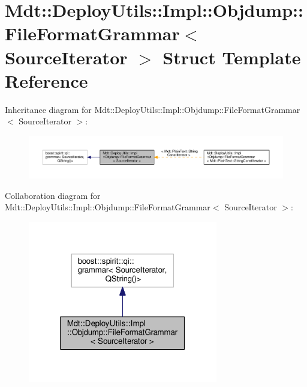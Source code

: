 \hypertarget{struct_mdt_1_1_deploy_utils_1_1_impl_1_1_objdump_1_1_file_format_grammar}{}\section{Mdt\+:\+:Deploy\+Utils\+:\+:Impl\+:\+:Objdump\+:\+:File\+Format\+Grammar$<$ Source\+Iterator $>$ Struct Template Reference}
\label{struct_mdt_1_1_deploy_utils_1_1_impl_1_1_objdump_1_1_file_format_grammar}


Inheritance diagram for Mdt\+:\+:Deploy\+Utils\+:\+:Impl\+:\+:Objdump\+:\+:File\+Format\+Grammar$<$ Source\+Iterator $>$\+:
\nopagebreak
\begin{figure}[H]
\begin{center}
\leavevmode
\includegraphics[width=350pt]{struct_mdt_1_1_deploy_utils_1_1_impl_1_1_objdump_1_1_file_format_grammar__inherit__graph}
\end{center}
\end{figure}


Collaboration diagram for Mdt\+:\+:Deploy\+Utils\+:\+:Impl\+:\+:Objdump\+:\+:File\+Format\+Grammar$<$ Source\+Iterator $>$\+:
\nopagebreak
\begin{figure}[H]
\begin{center}
\leavevmode
\includegraphics[width=235pt]{struct_mdt_1_1_deploy_utils_1_1_impl_1_1_objdump_1_1_file_format_grammar__coll__graph}
\end{center}
\end{figure}


